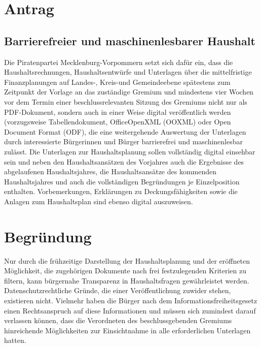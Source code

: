 \section{Antrag}

\subsection{Barrierefreier und maschinenlesbarer Haushalt}

Die Piratenpartei Mecklenburg-Vorpommern setzt sich dafür ein, dass die Haushaltsrechnungen, Haushaltsentwürfe und Unterlagen über die mittelfristige Finanzplanungen auf Landes-, Kreis-und Gemeindeebene spätestens zum Zeitpunkt der Vorlage an das zuständige Gremium und mindestens vier Wochen vor dem Termin einer beschlussrelevanten Sitzung des Gremiums nicht nur als PDF-Dokument, sondern auch in einer Weise digital veröffentlich werden (vorzugsweise Tabellendokument, OfficeOpenXML (OOXML) oder Open Document Format (ODF), die eine weitergehende Auswertung der Unterlagen durch interessierte Bürgerinnen und Bürger barrierefrei und maschinenlesbar zulässt. Die Unterlagen zur Haushaltsplanung sollen vollständig digital einsehbar sein und neben den Haushaltsansätzen des Vorjahres auch die Ergebnisse des abgelaufenen Haushaltsjahres, die Haushaltsansätze des kommenden Haushaltsjahres und auch die vollständigen Begründungen je Einzelposition enthalten. Vorbemerkungen, Erklärungen zu Deckungsfähigkeiten sowie die Anlagen zum Haushaltsplan sind ebenso digital auszuweisen.

\section{Begründung}

Nur durch die frühzeitige Darstellung der Haushaltsplanung und der eröffneten Möglichkeit, die zugehörigen Dokumente nach frei festzulegenden Kriterien zu filtern, kann bürgernahe Transparenz in Haushaltsfragen gewährleistet werden. Datenschutzrechtliche Gründe, die einer Veröffentlichung zuwider stehen, existieren nicht. Vielmehr haben die Bürger nach dem Informationsfreiheitsgesetz einen Rechtsanspruch auf diese Informationen und müssen sich zumindest darauf verlassen können, dass die Verordneten des beschlussgebenden Gremiums hinreichende Möglichkeiten zur Einsichtnahme in alle erforderlichen Unterlagen hatten.

